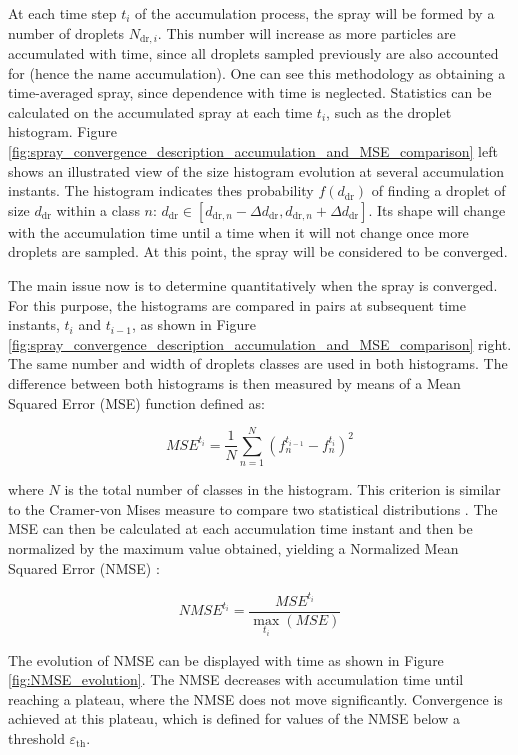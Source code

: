At each time step $t_i$ of the accumulation process, the spray will be formed by a number of droplets $N_{\mathrm{dr},i}$. This number will increase as more particles are accumulated with time, since all droplets sampled previously are also accounted for (hence the name accumulation). One can see this methodology as obtaining a time-averaged spray, since dependence with time is neglected. Statistics can be calculated on the accumulated spray at each time $t_i$, such as the droplet histogram. Figure \ref{fig:spray_convergence_description_accumulation_and_MSE_comparison} left shows an illustrated view of the size histogram evolution at several accumulation instants. The histogram indicates thes probability $f \left( d_\mathrm{dr} \right)$ of finding a droplet of size $d_\mathrm{dr}$ within a class $n$: $d_\mathrm{dr} \in \left[ d_{\mathrm{dr},n}-\Delta d_\mathrm{dr}, d_{\mathrm{dr},n}+\Delta d_\mathrm{dr} \right]$. Its shape will change with the accumulation time until a time when it will not change once more droplets are sampled. At this point, the spray will be considered to be converged. 

The main issue now is to determine quantitatively when the spray is converged. For this purpose, the histograms are compared in pairs at subsequent time instants, $t_i$ and $t_{i-1}$, as shown in Figure \ref{fig:spray_convergence_description_accumulation_and_MSE_comparison} right. The same number and width of droplets classes are used in both histograms. The difference between both histograms is then measured by means of a Mean Squared Error (MSE) function defined as:

\begin{equation}
MSE^{t_i} = \frac{1}{N} \sum_{n=1}^N \left( f_n^{t_{i-1}} - f_n^{t_i}  \right)^2
\end{equation}

where $N$ is the total number of classes in the histogram. This criterion is similar to the Cramer-von Mises measure to compare two statistical distributions . The MSE can then be calculated at each accumulation time instant and then be normalized by the maximum value obtained, yielding a Normalized Mean Squared Error (NMSE) :

\begin{equation}
NMSE^{t_i} = \frac{MSE^{t_i}}{\max_{t_i} \left( MSE \right)}
\end{equation}

The evolution of NMSE can be displayed with time as shown in Figure \ref{fig:NMSE_evolution}. The NMSE decreases with accumulation time until reaching a plateau, where the NMSE does not move significantly. Convergence is achieved at this plateau, which is defined for values of the NMSE below a threshold $\varepsilon_\mathrm{th}$.


